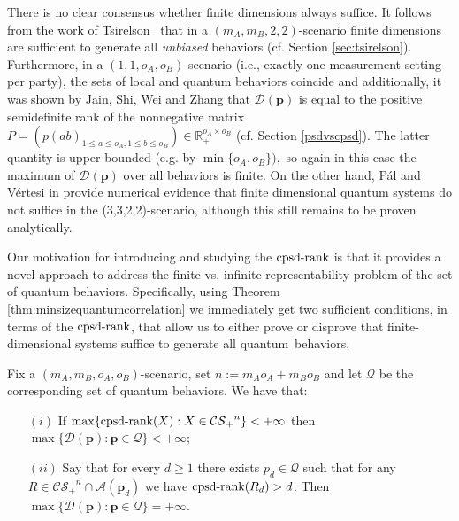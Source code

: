 \documentclass{siamart}
\begin{document}
{{{There is no  clear consensus  whether finite dimensions always
suffice.  It follows from the work of Tsirelson~\cite{TS87} that in a $(m_A,m_B,2,2)$-scenario finite dimensions are {sufficient} to generate all {\em unbiased} behaviors (cf. Section \ref{sec:tsirelson}).
Furthermore, in a
{$(1,1,o_A,o_B)$}-scenario (i.e., exactly one
measurement setting per party),  the sets of
local and quantum behaviors coincide  and additionally, it  was shown by Jain, Shi, Wei and Zhang \cite{JSWZ}
that  $\mathcal{D}({\mathbf{p}})$ is equal to the positive semidefinite rank
of the nonnegative matrix ${P=(p(ab)_{1 \leq a \leq o_A, 1 \leq b \leq o_B}) \in {\mathbb{R}}^{o_A\times o_B}_+}$  (cf. Section \ref{psdvscpsd}).   The latter quantity is upper
bounded (e.g. by ${\min\{o_A,o_B\})}, $ so again  in this case
{the maximum of} $\mathcal{D}({\mathbf{p}})$ over all behaviors is finite. On the other
hand, P\'al and V\'ertesi in \cite{Pal10} provide {numerical} evidence
that finite dimensional quantum systems do not suffice  in the
(3,3,2,2)-scenario, although this still remains to be proven analytically.

Our motivation for introducing and studying the ${\mathrm{cpsd}\textnormal{-rank}}$  is that it
provides a novel  approach to address  the finite vs. infinite
representability {problem} of the set of quantum behaviors.
Specifically, using Theorem \ref{thm:minsizequantumcorrelation} we
immediately get  two sufficient conditions, in terms of the
${\mathrm{cpsd}\textnormal{-rank}}$,  that allow us to either prove or disprove that {finite-dimensional} systems  suffice to generate all
quantum~behaviors.

\medskip
\begin{proposition}\label{eq:proposition}
Fix a  $(m_A,m_B,o_A,o_B)$-scenario,  set $ n:=m_Ao_A+m_Bo_B$ and let ${\mathcal{Q}}$ be the corresponding set of quantum behaviors. We have that:
\medskip
\begin{itemize}
 \item[$(i)$] If  $\max\{ {\mathrm{cpsd}\textnormal{-rank}}(X): X\in {\mathcal{CS}_+}^n \}<+\infty$ then  $ \max\{ \mathcal{D}({\mathbf{p}}): {{\mathbf{p}}\in {\mathcal{Q}}}\}<+\infty$;\medskip
 \item[$(ii)$]
Say that
 for every $d\ge 1$ there exists $p_d\in {\mathcal{Q}}$ such that  for any
 $R\in {\mathcal{CS}_+}^n\cap \mathcal{A}({\mathbf{p}}_d)$  we have   ${\mathrm{cpsd}\textnormal{-rank}}(R_d)>d$. Then
 $ \max\{  \mathcal{D}({\mathbf{p}}): {{\mathbf{p}}\in {\mathcal{Q}}}\}=+\infty$.
 \end{itemize}
\end{proposition}
\medskip

}}}
\end{document}
